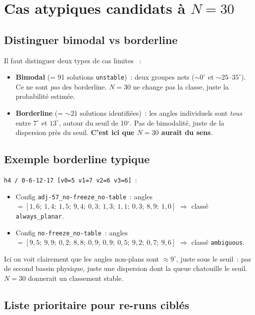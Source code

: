\documentclass[11pt,a4paper]{article}
\begin{document}
\section{Cas atypiques candidats à $N=30$}

\subsection{Distinguer bimodal vs borderline}

Il faut distinguer deux types de \og cas limites \fg{}~:
\begin{itemize}[leftmargin=2em,itemsep=0.3em]
  \item \textbf{Bimodal} (= 91 solutions \texttt{unstable})~: deux groupes nets ($\sim 0^\circ$ et $\sim 25\text{--}35^\circ$). Ce ne sont \emph{pas} des borderline. $N=30$ ne change pas la classe, juste la probabilité estimée.
  \item \textbf{Borderline} (= ${\sim}21$ solutions identifiées)~: les angles individuels sont \emph{tous} entre $7^\circ$ et $13^\circ$, autour du seuil de 10$^\circ$. Pas de bimodalité, juste de la dispersion près du seuil. \textbf{C'est ici que $N=30$ aurait du sens}.
\end{itemize}

\subsection{Exemple borderline typique}

\texttt{h4 / 0-6-12-17 [v0=5 v1=7 v2=6 v3=6]}~:
\begin{itemize}[leftmargin=2em,itemsep=0.2em]
  \item Config \texttt{adj-57\_no-freeze\_no-table}~: angles $= [1{,}6;\ 1{,}4;\ 1{,}5;\ 9{,}4;\ 0{,}3;\ 1{,}3;\ 1{,}1;\ 0{,}3;\ 8{,}9;\ 1{,}0]$ $\Rightarrow$ classé \texttt{always\_planar}.
  \item Config \texttt{no-freeze\_no-table}~: angles $= [9{,}5;\ 9{,}9;\ 0{,}2;\ 8{,}8;\ 0{,}9;\ 0{,}9;\ 0{,}5;\ 9{,}2;\ 0{,}7;\ 9{,}6]$ $\Rightarrow$ classé \texttt{ambiguous}.
\end{itemize}
Ici on voit clairement que les angles \og non-plans \fg{} sont $\approx 9^\circ$, juste sous le seuil~: pas de second bassin physique, juste une dispersion dont la queue chatouille le seuil. $N=30$ donnerait un classement stable.

\subsection{Liste prioritaire pour re-runs ciblés}
\end{document}
